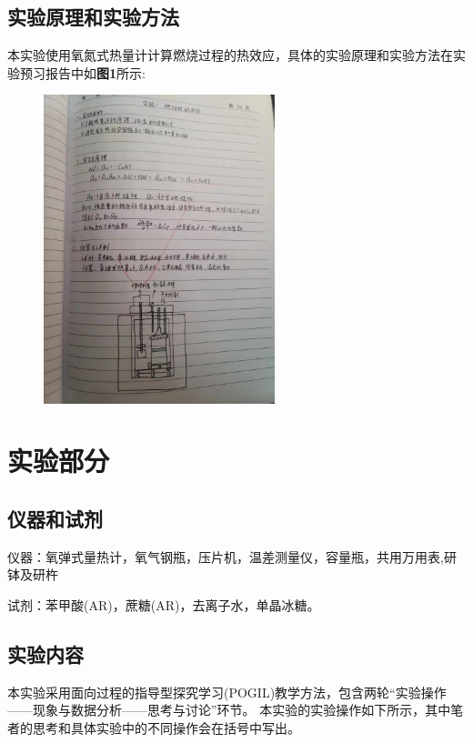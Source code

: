 \documentclass[12pt]{article}
\begin{document}
		\subsection{实验原理和实验方法}
		本实验使用氧氮式热量计计算燃烧过程的热效应，具体的实验原理和实验方法在实验预习报告中如\textbf{图1}所示: \par
		\begin{figure}[h]
			\centering
			\includegraphics[width=0.6\textwidth]{1.png}
		\end{figure}
			
	     
    \section{实验部分}
    	\subsection{仪器和试剂}
    		仪器：氧弹式量热计，氧气钢瓶，压片机，温差测量仪，容量瓶，共用万用表,研钵及研杵 \par
			试剂：苯甲酸(AR)，蔗糖(AR)，去离子水，单晶冰糖。\par
    			
    	 \subsection{实验内容}
		 本实验采用面向过程的指导型探究学习(POGIL)教学方法，包含两轮“实验操作——现象与数据分析——思考与讨论”环节。
		 本实验的实验操作如下所示，其中笔者的思考和具体实验中的不同操作会在括号中写出。\par
\end{document}
